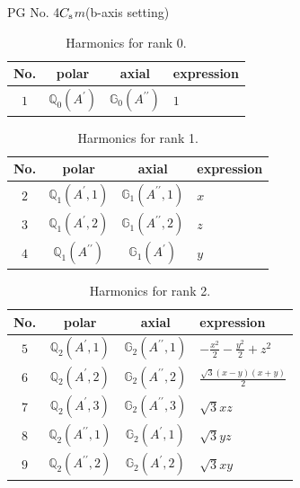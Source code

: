 \documentclass[fleqn,8pt,landscape]{jsarticle}
\begin{document}
\setcounter{MaxMatrixCols}{32}

\renewcommand{\tablename}{Table~}
\renewcommand{\figurename}{Figure~}
\begin{center}
\LARGE
PG No. 4\quad$C_{\rm s}$\quad$m$\quad(b-axis setting)\quad[ monoclinic ]
\end{center}
\begin{table}[ht!]
\begin{center}
\caption{Harmonics for rank 0.}
\renewcommand{\arraystretch}{1.3}
\begin{tabular}{cccl} \hline \hline
No. & polar & axial & expression \\ \hline
$ 1 $ & $ \mathbb{Q}_{0}(A^{\prime}) $ & $ \mathbb{G}_{0}(A^{\prime\prime}) $ & $ 1 $ \\
 \hline \hline
\end{tabular}
\end{center}
\end{table}
\begin{table}[ht!]
\begin{center}
\caption{Harmonics for rank 1.}
\renewcommand{\arraystretch}{1.3}
\begin{tabular}{cccl} \hline \hline
No. & polar & axial & expression \\ \hline
$ 2 $ & $ \mathbb{Q}_{1}(A^{\prime},1) $ & $ \mathbb{G}_{1}(A^{\prime\prime},1) $ & $ x $ \\
$ 3 $ & $ \mathbb{Q}_{1}(A^{\prime},2) $ & $ \mathbb{G}_{1}(A^{\prime\prime},2) $ & $ z $ \\
$ 4 $ & $ \mathbb{Q}_{1}(A^{\prime\prime}) $ & $ \mathbb{G}_{1}(A^{\prime}) $ & $ y $ \\
 \hline \hline
\end{tabular}
\end{center}
\end{table}
\begin{table}[ht!]
\begin{center}
\caption{Harmonics for rank 2.}
\renewcommand{\arraystretch}{1.3}
\begin{tabular}{cccl} \hline \hline
No. & polar & axial & expression \\ \hline
$ 5 $ & $ \mathbb{Q}_{2}(A^{\prime},1) $ & $ \mathbb{G}_{2}(A^{\prime\prime},1) $ & $ - \frac{x^{2}}{2} - \frac{y^{2}}{2} + z^{2} $ \\
$ 6 $ & $ \mathbb{Q}_{2}(A^{\prime},2) $ & $ \mathbb{G}_{2}(A^{\prime\prime},2) $ & $ \frac{\sqrt{3} \left(x - y\right) \left(x + y\right)}{2} $ \\
$ 7 $ & $ \mathbb{Q}_{2}(A^{\prime},3) $ & $ \mathbb{G}_{2}(A^{\prime\prime},3) $ & $ \sqrt{3} x z $ \\
$ 8 $ & $ \mathbb{Q}_{2}(A^{\prime\prime},1) $ & $ \mathbb{G}_{2}(A^{\prime},1) $ & $ \sqrt{3} y z $ \\
$ 9 $ & $ \mathbb{Q}_{2}(A^{\prime\prime},2) $ & $ \mathbb{G}_{2}(A^{\prime},2) $ & $ \sqrt{3} x y $ \\
 \hline \hline
\end{tabular}
\end{center}
\end{table}
\end{document}
